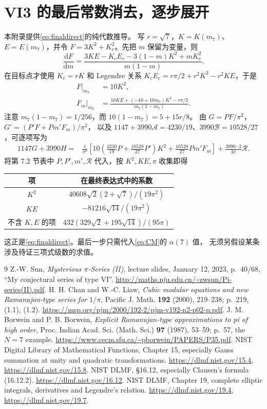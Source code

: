 \documentclass[11pt,a4paper]{article}
\numberwithin{equation}{section}
\theoremstyle{remark}\newtheorem{remark}[theorem]{说明}
\newcommand{\dd}{\mathrm d}
\newcommand{\RR}{\mathcal R}
\newcommand{\Afun}{\mathcal A}
\newcommand{\BB}{\mathcal B}
\begin{document}
\section{VI3 的最后常数消去，逐步展开}\label{app:final}
本附录提供\eqref{eq:finaldirect}的纯代数推导。
写 $r=\sqrt7$，$K=K(m_7)$、$E=E(m_7)$，并令
$F=3K^2+K_c^2$。先把 $m$ 保留为变量，则
\[
 \frac{\dd F}{\dd m}
 =\frac{3KE-K_cE_c-3(1-m)K^2+mK_c^2}{m(1-m)}.
\]
在目标点才使用 $K_c=rK$ 和 Legendre 关系
$K_cE_c=r\pi/2+r^2K^2-r^2KE$，于是
\begin{align*}
 F\big|_{m_7}&=10K^2,\\
 F_m\big|_{m_7}&=\frac{10KE+(-10+10m_7)K^2-r\pi/2}{m_7(1-m_7)}.
\end{align*}
注意 $m_7(1-m_7)=1/256$，而
$10(1-m_7)=5+15r/8$。
由 $G=PF/\pi^2$，$G'=(P'F+Pm'F_m)/\pi^2$，
以及 $1147+3990\Afun=4230/19$、$3990\BB=10528/27$，可逐项写为
\begin{align*}
 1147G+3990H
 ={}&\frac1{\pi^2}\left[
  10\left(\frac{4230}{19}P+\frac{10528}{27}P'\right)K^2
       +\frac{10528}{27}Pm'F_m\right]
       +\frac{3990\cdot3}{4\pi}\RR.
\end{align*}
将第 7.2 节表中 $P,P',m',\RR$ 代入，按 $K^2,KE,\pi$ 收集即得
\begin{center}\small\begin{tabular}{c c}\toprule
 项 & 在最终表达式中的系数\\\midrule
 $K^2$ & $40608\sqrt2(2+\sqrt7)/(19\pi^2)$\\
 $KE$ & $-81216\sqrt{14}/(19\pi^2)$\\
 不含 $K,E$ 的项 & $432(329\sqrt2+195\sqrt{14})/(95\pi)$\\\bottomrule
\end{tabular}\end{center}
这正是\eqref{eq:finaldirect}。最后一步只需代入\eqref{eq:CM}的 $\alpha(7)$ 值，
无须另假设某条涉及待证三项式级数的求值。

\clearpage
\begin{thebibliography}{9}
 Z.-W. Sun,
\emph{Mysterious $\pi$-Series (II)}, lecture slides, January 12, 2023,
p.~40/68, ``My conjectural series of type VI''.
\url{http://maths.nju.edu.cn/~zwsun/Pi-series(II).pdf}.
 H. H. Chan and W.-C. Liaw,
\emph{Cubic modular equations and new Ramanujan-type series for $1/\pi$},
Pacific J. Math. \textbf{192} (2000), 219--238; p.~219, (1.1), (1.2).
\url{https://msp.org/pjm/2000/192-2/pjm-v192-n2-p02-p.pdf}.
 J. M. Borwein and P. B. Borwein,
\emph{Explicit Ramanujan-type approximations to pi of high order},
Proc. Indian Acad. Sci. (Math. Sci.) \textbf{97} (1987), 53--59;
p.~57, the $N=7$ example.
\url{https://www.cecm.sfu.ca/~pborwein/PAPERS/P35.pdf}.
 NIST Digital Library of Mathematical Functions,
Chapter 15, especially Gauss summation at unity and quadratic transformations.
\url{https://dlmf.nist.gov/15.4}, \url{https://dlmf.nist.gov/15.8}.
 NIST DLMF, \S16.12, especially Clausen's formula (16.12.2).
\url{https://dlmf.nist.gov/16.12}.
 NIST DLMF, Chapter 19, complete elliptic integrals,
derivatives and Legendre's relation.
\url{https://dlmf.nist.gov/19.4}, \url{https://dlmf.nist.gov/19.7}.
\end{thebibliography}
\end{document}

